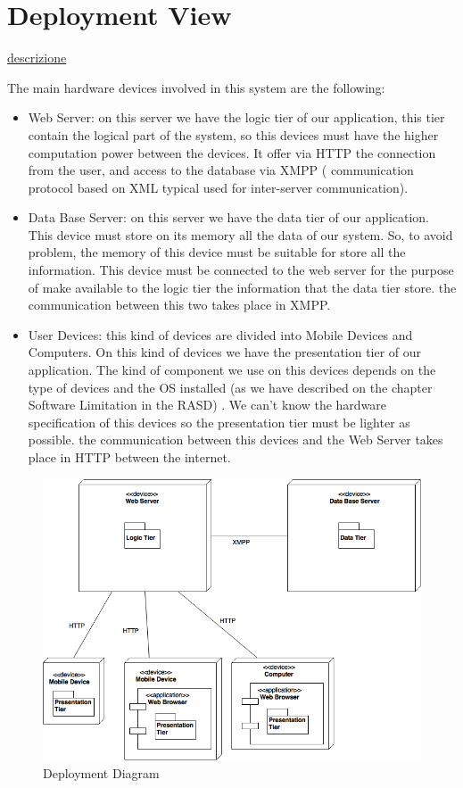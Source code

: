\documentclass[../../../../dd.tex]{subfiles}
\begin{document}
	\section{Deployment View}
		\href{https://en.wikipedia.org/wiki/Deployment_diagram}{descrizione}
		
		The main hardware devices involved in this system are the following:
		\begin{itemize} 
		\item Web Server: on this server we have the logic tier of our application, this tier contain the logical part of the system, so this devices must have the higher computation power between the devices. It offer via HTTP the connection from the user, and access to the database via XMPP ( communication protocol based on XML typical used for inter-server communication).
		\item Data Base Server: on this server we have the data tier of our application. This device must store on its memory all the data of our system. So, to avoid problem, the memory of this device must be suitable for store all the information. This device must be connected to the web server for the purpose of make available to the logic tier the information that the data tier store. the communication between this two takes place in XMPP.
		\item User Devices: this kind of devices are divided into Mobile Devices and Computers. On this kind of devices we have the presentation tier of our application. The kind of component we use on this devices depends on the type of devices and the OS installed (as we have described on the chapter Software Limitation in the RASD) . We can't know the hardware specification of this devices so the presentation tier must be lighter as possible.  the communication between this devices and the Web Server takes place in HTTP between the internet.
	\end{itemize}
	
	
	\begin{figure}[H]
				\centering
				\includegraphics[width=\textwidth, scale=0.5]{../images/Deploy.png}
			\caption{Deployment Diagram}\label{fig:Deploy}
		\end{figure}
	
\end{document}
